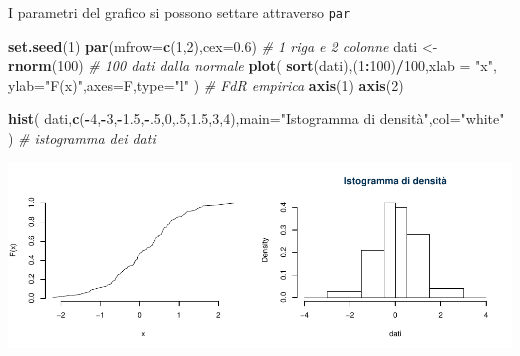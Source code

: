 \documentclass[
  11pt,
]{book}
\newenvironment{Shaded}{\begin{snugshade}}{\end{snugshade}}
\newcommand{\AttributeTok}[1]{\textcolor[rgb]{0.13,0.29,0.53}{#1}}
\newcommand{\CommentTok}[1]{\textcolor[rgb]{0.56,0.35,0.01}{\textit{#1}}}
\newcommand{\DecValTok}[1]{\textcolor[rgb]{0.00,0.00,0.81}{#1}}
\newcommand{\FloatTok}[1]{\textcolor[rgb]{0.00,0.00,0.81}{#1}}
\newcommand{\FunctionTok}[1]{\textcolor[rgb]{0.13,0.29,0.53}{\textbf{#1}}}
\newcommand{\NormalTok}[1]{#1}
\newcommand{\OtherTok}[1]{\textcolor[rgb]{0.56,0.35,0.01}{#1}}
\newcommand{\SpecialCharTok}[1]{\textcolor[rgb]{0.81,0.36,0.00}{\textbf{#1}}}
\newcommand{\StringTok}[1]{\textcolor[rgb]{0.31,0.60,0.02}{#1}}
\theoremstyle{mytheoremstyle}
\theoremstyle{mydefstyle}
\begin{document}
I parametri del grafico si possono settare attraverso \texttt{par}

\begin{Shaded}
\begin{Highlighting}[]
\FunctionTok{set.seed}\NormalTok{(}\DecValTok{1}\NormalTok{)}
\FunctionTok{par}\NormalTok{(}\AttributeTok{mfrow=}\FunctionTok{c}\NormalTok{(}\DecValTok{1}\NormalTok{,}\DecValTok{2}\NormalTok{),}\AttributeTok{cex=}\FloatTok{0.6}\NormalTok{) }\CommentTok{\# 1 riga e 2 colonne}
\NormalTok{dati }\OtherTok{\textless{}{-}} \FunctionTok{rnorm}\NormalTok{(}\DecValTok{100}\NormalTok{) }\CommentTok{\# 100 dati dalla normale}
\FunctionTok{plot}\NormalTok{(}
  \FunctionTok{sort}\NormalTok{(dati),(}\DecValTok{1}\SpecialCharTok{:}\DecValTok{100}\NormalTok{)}\SpecialCharTok{/}\DecValTok{100}\NormalTok{,}\AttributeTok{xlab =} \StringTok{"x"}\NormalTok{, }\AttributeTok{ylab=}\StringTok{"F(x)"}\NormalTok{,}\AttributeTok{axes=}\NormalTok{F,}\AttributeTok{type=}\StringTok{"l"}
\NormalTok{  ) }\CommentTok{\# FdR empirica}
\FunctionTok{axis}\NormalTok{(}\DecValTok{1}\NormalTok{)}
\FunctionTok{axis}\NormalTok{(}\DecValTok{2}\NormalTok{)}

\FunctionTok{hist}\NormalTok{(}
\NormalTok{  dati,}\FunctionTok{c}\NormalTok{(}\SpecialCharTok{{-}}\DecValTok{4}\NormalTok{,}\SpecialCharTok{{-}}\DecValTok{3}\NormalTok{,}\SpecialCharTok{{-}}\FloatTok{1.5}\NormalTok{,}\SpecialCharTok{{-}}\NormalTok{.}\DecValTok{5}\NormalTok{,}\DecValTok{0}\NormalTok{,.}\DecValTok{5}\NormalTok{,}\FloatTok{1.5}\NormalTok{,}\DecValTok{3}\NormalTok{,}\DecValTok{4}\NormalTok{),}\AttributeTok{main=}\StringTok{"Istogramma di densità"}\NormalTok{,}\AttributeTok{col=}\StringTok{"white"}
\NormalTok{  ) }\CommentTok{\# istogramma dei dati}
\end{Highlighting}
\end{Shaded}

\begin{center}\includegraphics{Appunti_di_Statistica_2025_files/figure-latex/24-Libro-34,-1} \end{center}
\end{document}
